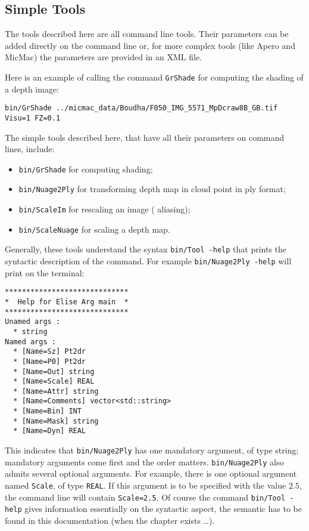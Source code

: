 \subsection{Simple Tools}

The tools described here are all command line tools. Their parameters can be added
directly on the command line or, for more complex tools (like Apero and MicMac) the
parameters are provided in an XML file.

Here is an example of calling the command {\tt GrShade} for computing the shading 
of a depth image:

\begin{verbatim}
bin/GrShade ../micmac_data/Boudha/F050_IMG_5571_MpDcraw8B_GB.tif Visu=1 FZ=0.1
\end{verbatim}

The simple tools described here, that have all their parameters on command lines,
include:

\begin{itemize}
    \item {\tt bin/GrShade} for computing shading;
    \item {\tt bin/Nuage2Ply} for transforming depth map in cloud point in ply format;
    \item {\tt bin/ScaleIm} for rescaling an image ( aliasing); %
    \item {\tt bin/ScaleNuage} for scaling a depth map.
\end{itemize}

Generally, these tools understand the syntax {\tt bin/Tool -help} that prints the syntactic
description of the command. For example{ \tt bin/Nuage2Ply -help} will print on the terminal:

\begin{verbatim}
*****************************
*  Help for Elise Arg main  *
*****************************
Unamed args : 
  * string
Named args : 
  * [Name=Sz] Pt2dr
  * [Name=P0] Pt2dr
  * [Name=Out] string
  * [Name=Scale] REAL
  * [Name=Attr] string
  * [Name=Comments] vector<std::string>
  * [Name=Bin] INT
  * [Name=Mask] string
  * [Name=Dyn] REAL
\end{verbatim}


This indicates that {\tt bin/Nuage2Ply} has one mandatory argument, of type string;
mandatory arguments come first and the order matters. { \tt bin/Nuage2Ply}  also admits 
several optional arguments. For example, there is one optional argument named  { \tt Scale},
of type  { \tt REAL}. If this argument is to be specified with the value $2.5$,  the command
line will contain {\tt Scale=2.5}.  Of course the command  {\tt bin/Tool -help} gives information
essentially on the syntactic aspect, the semantic has to be found in this documentation
(when the chapter exists \dots).

